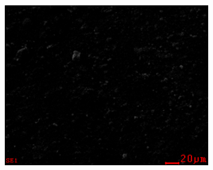\begin{figure}[H]
	\centering
	\includegraphics[width=0.8\textwidth]{media/chem2/image88}
	\caption*{}
\end{figure}

